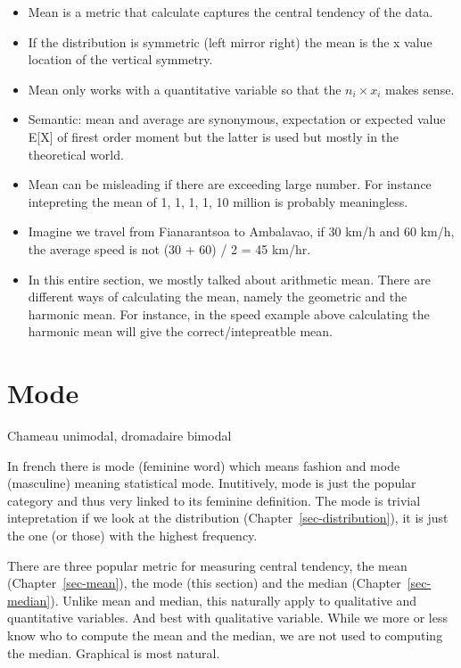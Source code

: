 \documentclass[
  letterpaper,
  DIV=11,
  numbers=noendperiod]{scrreprt}
\providecommand{\tightlist}{%
  \setlength{\itemsep}{0pt}\setlength{\parskip}{0pt}}
\begin{document}
\begin{itemize}
\tightlist
\item
  Mean is a metric that calculate captures the central tendency of the
  data.
\item
  If the distribution is symmetric (left mirror right) the mean is the x
  value location of the vertical symmetry.
\item
  Mean only works with a quantitative variable so that the
  \(n_i \times x_i\) makes sense.
\item
  Semantic: mean and average are synonymous, expectation or expected
  value E{[}X{]} of firest order moment but the latter is used but
  mostly in the theoretical world.
\item
  Mean can be misleading if there are exceeding large number. For
  instance intepreting the mean of 1, 1, 1, 1, 10 million is probably
  meaningless.
\item
  Imagine we travel from Fianarantsoa to Ambalavao, if 30 km/h and 60
  km/h, the average speed is not (30 + 60) / 2 = 45 km/hr.
\item
  In this entire section, we mostly talked about arithmetic mean. There
  are different ways of calculating the mean, namely the geometric and
  the harmonic mean. For instance, in the speed example above
  calculating the harmonic mean will give the correct/intepreatble mean.
\end{itemize}

\chapter{Mode}\label{sec-mode}

Chameau unimodal, dromadaire bimodal

In french there is mode (feminine word) which means fashion and mode
(masculine) meaning statistical mode. Inutitively, mode is just the
popular category and thus very linked to its feminine definition. The
mode is trivial intepretation if we look at the distribution
(Chapter~\ref{sec-distribution}), it is just the one (or those) with the
highest frequency.

There are three popular metric for measuring central tendency, the mean
(Chapter~\ref{sec-mean}), the mode (this section) and the median
(Chapter~\ref{sec-median}). Unlike mean and median, this naturally apply
to qualitative and quantitative variables. And best with qualitative
variable. While we more or less know who to compute the mean and the
median, we are not used to computing the median. Graphical is most
natural.
\end{document}
